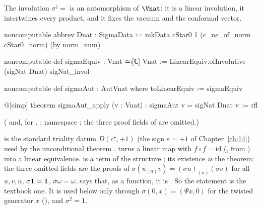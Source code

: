 \begin{theorem}[$\sigma^\natural\in\Aut(\Vnat)$]\label{ch20:thm:sigma}
The involution $\sigma^\natural=$  is an automorphism of $\Vnat$: it is a linear involution, it
intertwines every product, and it fixes the vacuum and the conformal vector.
\end{theorem}
\begin{leancode}
noncomputable abbrev Dnat : SigmaData :=
  mkData cStar0 1 (c_ne_of_norm cStar0_norm) (by norm_num)

noncomputable def sigmaEquiv : Vnat ≃ₗ[ℂ] Vnat :=
  LinearEquiv.ofInvolutive (sigNat Dnat) sigNat_invol

noncomputable def sigmaAut : AutVnat where
  toLinearEquiv := sigmaEquiv

@[simp] theorem sigmaAut_apply (v : Vnat) : sigmaAut v = sigNat Dnat v := rfl
\end{leancode}
( and, for , ; namespace
; the three proof fields of  are omitted.)
\begin{dictionary}
 is the standard triality datum $D(c^\star,+1)$ (the sign $\varepsilon=+1$ of Chapter~\ref{ch:14}) used by the
unconditional theorem .   turns a linear map with $f\circ f=\mathrm{id}$
(, from ) into a linear equivalence.   is a term of the
structure ; its existence \emph{is} the theorem: the three omitted fields are the proofs of
$\sigma(u_{(n)}v)=(\sigma u)_{(n)}(\sigma v)$ for all $u,v,n$, $\sigma\mathbf 1=\mathbf 1$, $\sigma\omega=\omega$.
 says that, as a function, it is .  So the statement is the textbook one.
It is used below only through $\sigma(0,x)=(\Psi x,0)$ for the twisted generator $x$ (), and
$\sigma^2=1$.
\end{dictionary}
